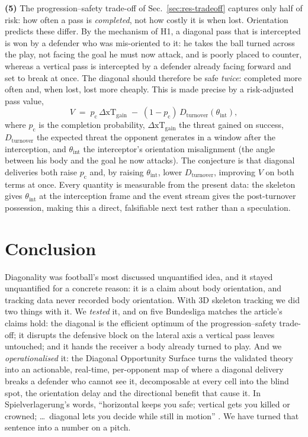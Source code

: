 \documentclass[11pt]{article}
\begin{document}
\textbf{(5)} The progression--safety trade-off of
Sec.~\ref{sec:res-tradeoff} captures only half of risk: how often a pass
is \emph{completed}, not how costly it is when lost. Orientation predicts
these differ. By the mechanism of H1, a diagonal pass that is intercepted
is won by a defender who was mis-oriented to it: he takes the ball turned
across the play, not facing the goal he must now attack, and is poorly
placed to counter, whereas a vertical pass is intercepted by a defender
already facing forward and set to break at once. The diagonal should
therefore be safe \emph{twice}: completed more often and, when lost, lost
more cheaply. This is made precise by a risk-adjusted pass value,
\begin{equation}
  V \;=\; p_\mathrm{c}\,\Delta\mathrm{xT}_\mathrm{gain}
       \;-\; (1-p_\mathrm{c})\,D_\mathrm{turnover}(\theta_\mathrm{int}),
\end{equation}
where $p_\mathrm{c}$ is the completion probability, $\Delta\mathrm{xT}_\mathrm{gain}$
the threat gained on success, $D_\mathrm{turnover}$ the expected threat the
opponent generates in a window after the interception, and
$\theta_\mathrm{int}$ the interceptor's orientation misalignment (the angle
between his body and the goal he now attacks). The conjecture is that
diagonal deliveries both raise $p_\mathrm{c}$ and, by raising
$\theta_\mathrm{int}$, lower $D_\mathrm{turnover}$, improving $V$ on both
terms at once. Every quantity is measurable from the present data: the
skeleton gives $\theta_\mathrm{int}$ at the interception frame and the
event stream gives the post-turnover possession, making this a direct,
falsifiable next test rather than a speculation.

\section{Conclusion}
\label{sec:conclusion}

Diagonality was football's most discussed unquantified idea, and it stayed
unquantified for a concrete reason: it is a claim about body orientation,
and tracking data never recorded body orientation. With 3D skeleton
tracking we did two things with it. We \emph{tested} it, and on five
Bundesliga matches the article's claims hold: the diagonal is the
efficient optimum of the progression--safety trade-off; it disrupts the
defensive block on the lateral axis a vertical pass leaves untouched; and
it hands the receiver a body already turned to play. And we
\emph{operationalised} it: the Diagonal Opportunity Surface turns the
validated theory into an actionable, real-time, per-opponent map of where
a diagonal delivery breaks a defender who cannot see it, decomposable at
every cell into the blind spot, the orientation delay and the directional
benefit that cause it. In Spielverlagerung's words, ``horizontal keeps you
safe; vertical gets you killed or crowned; \dots\ diagonal lets you decide
while still in motion'' \citep{spielverlagerung2025}. We have turned that
sentence into a number on a pitch.



\end{document}
